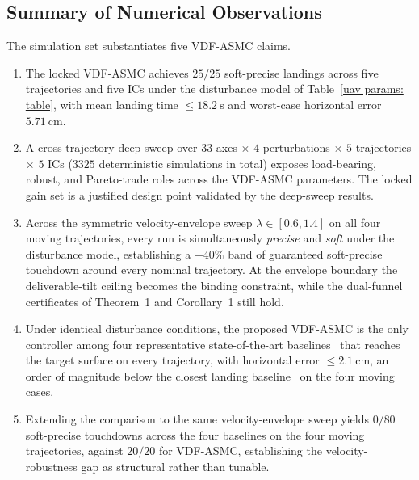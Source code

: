 \documentclass{IEEEtaes}
\begin{document}
\subsection{Summary of Numerical Observations}
\label{summary: subsec}
The simulation set substantiates five VDF-ASMC claims.
\begin{enumerate}
    \item The locked VDF-ASMC achieves $25/25$ soft-precise landings across five trajectories and five ICs under the disturbance model of Table~\ref{uav params: table}, with mean landing time $\le 18.2~\text{s}$ and worst-case horizontal error $5.71~\text{cm}$.
    \item A cross-trajectory deep sweep over $33$ axes $\times$ $4$ perturbations $\times$ $5$ trajectories $\times$ $5$ ICs ($3325$ deterministic simulations in total) exposes load-bearing, robust, and Pareto-trade roles across the VDF-ASMC parameters. The locked gain set is a justified design point validated by the deep-sweep results.
    \item Across the symmetric velocity-envelope sweep $\lambda\in[0.6,1.4]$ on all four moving trajectories, every run is simultaneously \emph{precise} and \emph{soft} under the disturbance model, establishing a $\pm 40\%$ band of guaranteed soft-precise touchdown around every nominal trajectory. At the envelope boundary the deliverable-tilt ceiling becomes the binding constraint, while the dual-funnel certificates of Theorem~1 and Corollary~1 still hold.
    \item Under identical disturbance conditions, the proposed VDF-ASMC is the only controller among four representative state-of-the-art baselines~\cite{lin2022,zhang2026,lin2023,cho2022} that reaches the target surface on every trajectory, with horizontal error $\le 2.1~\text{cm}$, an order of magnitude below the closest landing baseline~\cite{zhang2026} on the four moving cases.
    \item Extending the comparison to the same velocity-envelope sweep yields $0/80$ soft-precise touchdowns across the four baselines on the four moving trajectories, against $20/20$ for VDF-ASMC, establishing the velocity-robustness gap as structural rather than tunable.
\end{enumerate}



\end{document}
